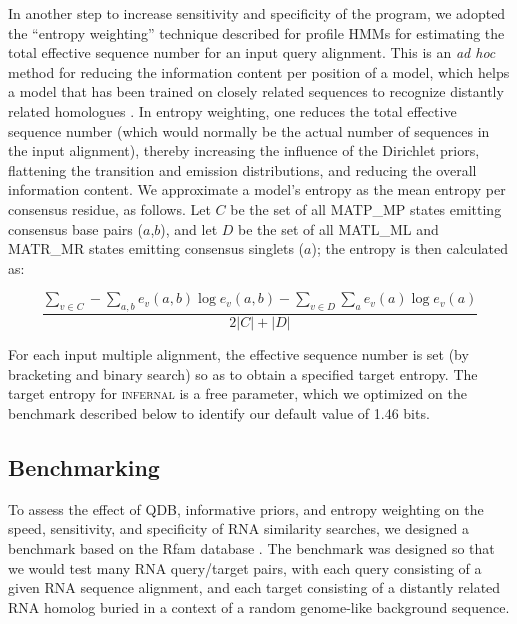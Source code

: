 \documentclass[11pt]{article}
\newif\ifdraft
\begin{document}
\ifdraft

\fi

\ifdraft

\fi

\ifdraft

\fi

In another step to increase sensitivity and specificity of the
program, we adopted the ``entropy weighting'' technique described for
profile HMMs \cite{Karplus98} for estimating the total effective
sequence number for an input query alignment. This is an \emph{ad hoc}
method for reducing the information content per position of a model,
which helps a model that has been trained on closely related sequences
to recognize distantly related homologues \cite{Altschul91}. In
entropy weighting, one reduces the total effective sequence number
(which would normally be the actual number of sequences in the input
alignment), thereby increasing the influence of the Dirichlet priors,
flattening the transition and emission distributions, and reducing the
overall information content. We approximate a model's entropy as the
mean entropy per consensus residue, as follows. Let $C$ be the set of
all MATP\_MP states emitting consensus base pairs ($a$,$b$), and let
$D$ be the set of all MATL\_ML and MATR\_MR states emitting consensus
singlets ($a$); the entropy is then calculated as:

\[
\frac{ \sum_{v \in C} - \sum_{a,b} e_v(a,b) \log e_v(a,b) -
       \sum_{v \in D} \sum_{a}   e_v(a)   \log e_v(a)}
{2|C| + |D|}
\]

For each input multiple alignment, the effective sequence number is
set (by bracketing and binary search) so as to obtain a specified
target entropy.  The target entropy for \textsc{infernal} is a free
parameter, which we optimized on the benchmark described below to
identify our default value of 1.46 bits.

\subsection{Benchmarking}

To assess the effect of QDB, informative priors, and entropy weighting
on the speed, sensitivity, and specificity of RNA similarity searches,
we designed a benchmark based on the Rfam database
\cite{Griffiths-Jones05}. The benchmark was designed so that we would
test many RNA query/target pairs, with each query consisting of a
given RNA sequence alignment, and each target consisting of a
distantly related RNA homolog buried in a context of a random
genome-like background sequence.
\end{document}

